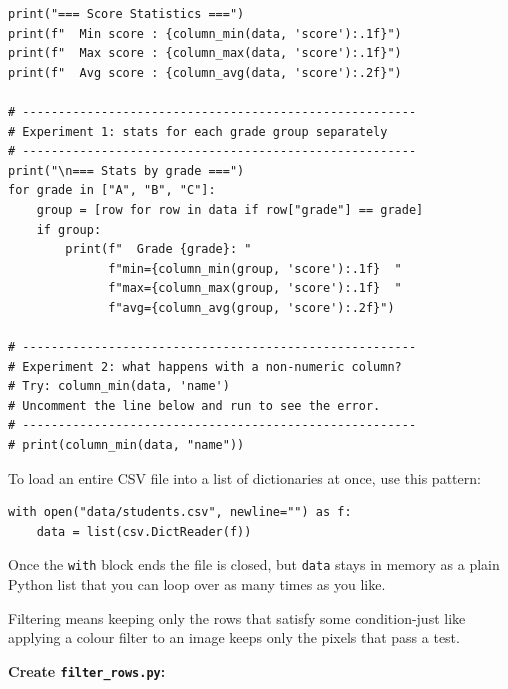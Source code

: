 \documentclass{cslab}
\begin{document}
\begin{lstlisting}
print("=== Score Statistics ===")
print(f"  Min score : {column_min(data, 'score'):.1f}")
print(f"  Max score : {column_max(data, 'score'):.1f}")
print(f"  Avg score : {column_avg(data, 'score'):.2f}")

# -------------------------------------------------------
# Experiment 1: stats for each grade group separately
# -------------------------------------------------------
print("\n=== Stats by grade ===")
for grade in ["A", "B", "C"]:
    group = [row for row in data if row["grade"] == grade]
    if group:
        print(f"  Grade {grade}: "
              f"min={column_min(group, 'score'):.1f}  "
              f"max={column_max(group, 'score'):.1f}  "
              f"avg={column_avg(group, 'score'):.2f}")

# -------------------------------------------------------
# Experiment 2: what happens with a non-numeric column?
# Try: column_min(data, 'name')
# Uncomment the line below and run to see the error.
# -------------------------------------------------------
# print(column_min(data, "name"))
\end{lstlisting}

\begin{hint}
To load an entire CSV file into a list of dictionaries at once, use this pattern:
\begin{lstlisting}[numbers=none]
with open("data/students.csv", newline="") as f:
    data = list(csv.DictReader(f))
\end{lstlisting}
Once the \texttt{with} block ends the file is closed, but \texttt{data} stays in memory as a plain Python list that you can loop over as many times as you like.
\end{hint}


Filtering means keeping only the rows that satisfy some condition-just like applying a colour filter to an image keeps only the pixels that pass a test.

\textbf{Create \texttt{filter\_rows.py}:}
\end{document}
